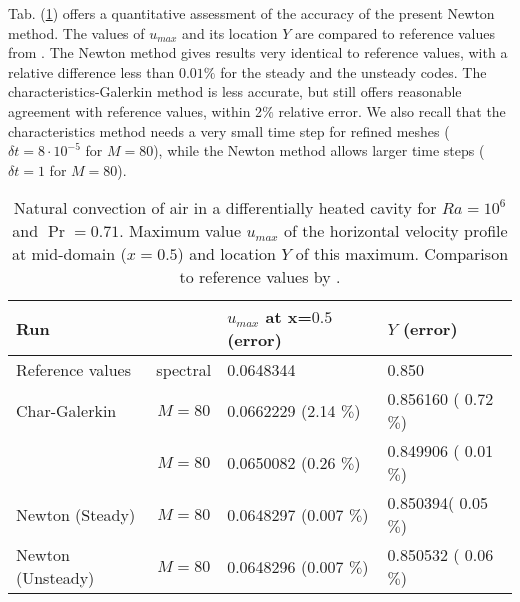 Tab. (\ref{tab-valid-natconv}) offers a quantitative assessment of the accuracy of the present Newton method. 
The values of $u_{max}$  and its location $Y$ are compared to reference values from \cite{LeQuere91}. 
The Newton method gives results very identical to reference values, with a relative difference less than $0.01 \%$ for the steady and the unsteady codes. 
The characteristics-Galerkin method is less accurate, but still offers reasonable agreement with reference values, within 2$\%$ relative error. 
We also recall that the characteristics method needs a very small time step for refined meshes ($\delta t = 8\cdot 10^{-5}$ for $M=80$), while the Newton method allows larger time steps ($\delta t = 1$ for $M=80$). %
\begin{table}%
	\begin{center}
		\begin{tabular}{|l|c|l|l|}
			\hline
			\multicolumn{2}{|l|}{Run} & $u_{max}$ at x=$0.5$ (error) & $Y$ (error) \\
			\hline
			Reference values & spectral & 0.0648344           & 0.850 \\ \hline
			Char-Galerkin       &$M=80$ & 0.0662229 (2.14 $\%$) & 0.856160 ( 0.72 $\%$) \\ \hline
			\cite{dan-2014-JCP}              &$M=80$ & 0.0650082 (0.26 $\%$) & 0.849906 ( 0.01 $\%$) \\ \hline
			Newton (Steady)        &$M=80$ & 0.0648297 (0.007 $\%$) & 0.850394( 0.05 $\%$) \\ \hline
			Newton (Unsteady)        &$M=80$ & 0.0648296 (0.007 $\%$) & 0.850532 ( 0.06 $\%$) \\ \hline
		\end{tabular}
	\end{center}
	\caption {Natural convection of air in a differentially heated cavity for $Ra = 10^6$ and $\Pr = 0.71$. Maximum value $u_{max}$ of the horizontal velocity profile at mid-domain ($x=0.5$) and location $Y$ of this maximum. Comparison to reference values by \cite{LeQuere91}.}
	\label{tab-valid-natconv}
\end{table}

